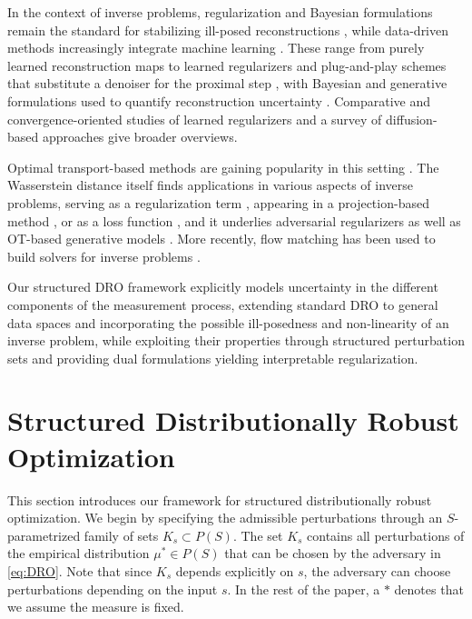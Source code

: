 \documentclass{article}
\theoremstyle{definition}
\theoremstyle{remarksty}
\begin{document}
In the context of inverse problems, regularization and Bayesian formulations remain the standard for stabilizing ill-posed reconstructions \cite{benning_modern_2018}, while data-driven methods increasingly integrate machine learning \cite{arridge_solving_2019, mukherjee_end--end_2021, hauptmann_convergent_2025, ongie_deep_2020}. These range from purely learned reconstruction maps \cite{adler_learned_2018, jin_deep_2017, zhu_image_2018} to learned regularizers \cite{li_nett_2020, kobler_total_2020-1, habring_neural-network-based_2024, goujon_neural-network-based_2023} and plug-and-play schemes that substitute a denoiser for the proximal step \cite{sun_online_2019, pesquet_learning_2021}, with Bayesian and generative formulations used to quantify reconstruction uncertainty \cite{barbano_quantifying_2021, oliviero-durmus_generative_2025}. Comparative and convergence-oriented studies of learned regularizers \cite{hertrich_learning_2025, mukherjee_learned_2023} and a survey of diffusion-based approaches \cite{daras_survey_2024} give broader overviews.

Optimal transport-based methods are gaining popularity in this setting \cite{carioni_unsupervised_2023}. The Wasserstein distance itself finds applications in various aspects of inverse problems, serving as a regularization term \cite{bredies_generalized_2023-1}, appearing in a projection-based method \cite{heaton_wasserstein-based_2022}, or as a loss function \cite{adler_learning_2017}, and it underlies adversarial regularizers \cite{lunz_adversarial_2019} as well as OT-based generative models \cite{arjovsky_wasserstein_2017, genevay_learning_2018, patrini_sinkhorn_2020}. More recently, flow matching has been used to build solvers for inverse problems \cite{pourya_flower_2026, martin_PnP-flow_2025}.

Our structured DRO framework explicitly models uncertainty in the different components of the measurement process, extending standard DRO to general data spaces and incorporating the possible ill-posedness and non-linearity of an inverse problem, while exploiting their properties through structured perturbation sets and providing dual formulations yielding interpretable regularization.
\section{Structured Distributionally Robust Optimization}
This section introduces our framework for structured distributionally robust optimization. We begin by specifying the admissible perturbations through an $S$-parametrized family of sets $K_s \subset P(S)$. The set $K_s$ contains all perturbations of the empirical distribution $\mu^* \in P(S)$ that can be chosen by the adversary in \eqref{eq:DRO}. Note that since $K_s$ depends explicitly on $s$, the adversary can choose perturbations depending on the input $s$. In the rest of the paper, a $*$ denotes that we assume the measure is fixed. 
\end{document}

